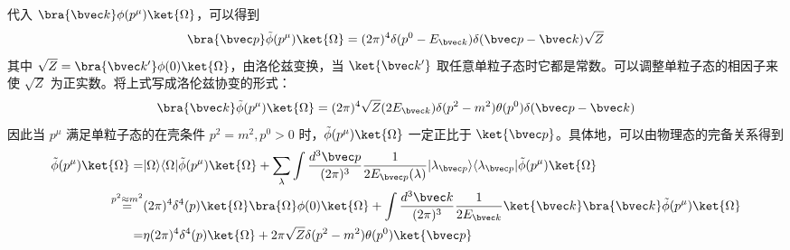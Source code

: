 代入 $\bra{\bvec k}\phi(p^\mu)\ket{\Omega}$，可以得到
\[
\bra{\bvec p}\tilde\phi(p^\mu)\ket{\Omega}=(2\pi)^4\delta(p^0-E_{\bvec k})\delta(\bvec p-\bvec k) \sqrt{Z}
\]
其中 $\sqrt{Z}=\bra{\bvec k'}\phi(0)\ket{\Omega}$，由洛伦兹变换，当 $\ket{\bvec k'}$ 取任意单粒子态时它都是常数。可以调整单粒子态的相因子来使 $\sqrt{Z}$ 为正实数。将上式写成洛伦兹协变的形式：
\[
\bra{\bvec k}\tilde\phi(p^\mu)\ket{\Omega}=(2\pi)^4 \sqrt{Z} (2E_{\bvec k})\delta(p^2-m^2)\theta(p^0) \delta(\bvec p-\bvec k)
\]
因此当 $p^\mu$ 满足单粒子态的在壳条件 $p^2=m^2,p^0>0$ 时，$\tilde \phi(p^\mu)\ket{\Omega}$ 一定正比于 $\ket{\bvec p}$。具体地，可以由物理态的完备关系得到
\begin{equation}\label{eq_LSZ_3}\begin{aligned}
\tilde \phi(p^\mu)\ket{\Omega}=&|\Omega\rangle \langle \Omega|\tilde \phi(p^\mu)\ket{\Omega} + \sum_{\lambda}\int \frac{d^3  \bvec p}{(2\pi)^3}\frac{1}{2E_{\bvec p}(\lambda)}|\lambda_{\bvec p}\rangle \langle \lambda_{\bvec p}|\tilde \phi(p^\mu)\ket{\Omega}\\ \overset{p^2\approx m^2}{=}&(2\pi)^4 \delta^4(p)\ket{\Omega}\bra{\Omega}\phi(0)\ket{\Omega}
+
\int \frac{d^3 {\bvec k}}{(2\pi)^3}\frac{1}{2 E_{\bvec k}} \ket{\bvec k}\bra{\bvec k}\tilde \phi(p^\mu)\ket{\Omega}\\
=&\eta(2\pi)^4\delta^4(p)\ket{\Omega}+2\pi \sqrt{Z} \delta(p^2-m^2)\theta(p^0) \ket{\bvec p}
\end{aligned}\end{equation}

